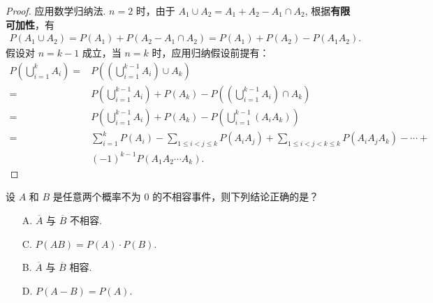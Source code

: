 \documentclass[12pt, a4paper, oneside, UTF8]{ctexbook}
\begin{document}
\begin{proof}
    应用数学归纳法. \(n = 2\) 时，由于 \(A_1 \cup A_2 = A_1 + A_2 - A_1 \cap A_2\), 根据\textbf{有限可加性}，有
    \begin{align*}
        P\left(A_1\cup A_2\right) = P\left(A_1\right) + P\left(A_2 - A_1 \cap A_2\right) = P\left(A_1\right) + P\left(A_2\right) - P\left(A_1 A_2\right).
    \end{align*}
    假设对 \(n = k - 1\) 成立，当 \(n = k\) 时，应用归纳假设前提有：
    \begin{align*}
        P\left(\bigcup_{i = 1}^{k} A_i\right) =& P\left(\left(\bigcup_{i = 1}^{k - 1}A_i\right) \cup A_k\right) \\
        =& P\left(\bigcup_{i = 1}^{k - 1} A_i\right) + P\left(A_k\right) - P\left(\left(\bigcup_{i = 1}^{k - 1} A_i\right) \cap A_k\right) \\
        =& P\left(\bigcup_{i = 1}^{k - 1} A_i\right) + P\left(A_k\right) - P\left(\bigcup_{i = 1}^{k - 1} \left(A_i A_k\right)\right) \\
        =& \sum_{i = 1}^{k}P\left(A_i\right) - \sum_{1 \leqslant i < j \leqslant k} P\left(A_i A_j\right) + \sum_{1 \leqslant i < j < k \leqslant k} P\left(A_i A_j A_k\right) - \cdots + \\
        & \left(-1\right)^{k-1}P\left(A_1 A_2 \cdots A_k\right).
    \end{align*}
\end{proof}

\begin{example}
    设 \(A\) 和 \(B\) 是任意两个概率不为 \(0\) 的不相容事件，则下列结论正确的是？
    
    \vspace{0.5cm}

    \begin{minipage}[l]{0.45\textwidth}
        \begin{enumerate}
            \item[A.] \(\overline{A}\) 与 \(\overline{B}\) 不相容.
            \item[C.] \(P\left(AB\right) = P\left(A\right) \cdot P\left(B\right)\).
        \end{enumerate}
    \end{minipage}
    \begin{minipage}[c]{0.45\textwidth}
        \begin{enumerate}
            \item[B.] \(\overline{A}\) 与 \(\overline{B}\) 相容.
            \item[D.] \(P\left(A - B\right) = P\left(A\right)\).
        \end{enumerate}
    \end{minipage}
\end{example}
\end{document}
